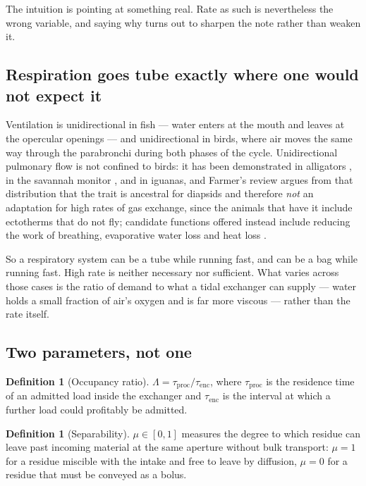 \documentclass[11pt]{article}
\theoremstyle{plain}
\theoremstyle{definition}
\newtheorem{definition}[theorem]{Definition}
\begin{document}
The intuition is pointing at something real. Rate as such is nevertheless the wrong variable, and
saying why turns out to sharpen the note rather than weaken it.

\subsection{Respiration goes tube exactly where one would not expect it}

Ventilation is unidirectional in fish --- water enters at the mouth and leaves at the opercular
openings --- and unidirectional in birds, where air moves the same way through the parabronchi during
both phases of the cycle. Unidirectional pulmonary flow is not confined to birds: it has been
demonstrated in alligators \cite{farmersanders2010}, in the savannah monitor \cite{schachner2014}, and
in iguanas, and Farmer's review argues from that distribution that the trait is ancestral for
diapsids and therefore \emph{not} an adaptation for high rates of gas exchange, since the animals
that have it include ectotherms that do not fly; candidate functions offered instead include reducing
the work of breathing, evaporative water loss and heat loss \cite{farmer2015}.

So a respiratory system can be a tube while running fast, and can be a bag while running fast. High
rate is neither necessary nor sufficient. What varies across those cases is the ratio of demand to
what a tidal exchanger can supply --- water holds a small fraction of air's oxygen and is far more
viscous --- rather than the rate itself.

\subsection{Two parameters, not one}

\begin{definition}[Occupancy ratio]
\label{def:lambda}
$\Lambda = \tau_{\mathrm{proc}} / \tau_{\mathrm{enc}}$, where $\tau_{\mathrm{proc}}$ is the residence
time of an admitted load inside the exchanger and $\tau_{\mathrm{enc}}$ is the interval at which a
further load could profitably be admitted.
\end{definition}

\begin{definition}[Separability]
\label{def:mu}
$\mu \in [0,1]$ measures the degree to which residue can leave past incoming material at the same
aperture without bulk transport: $\mu = 1$ for a residue miscible with the intake and free to leave by
diffusion, $\mu = 0$ for a residue that must be conveyed as a bolus.
\end{definition}
\end{document}
